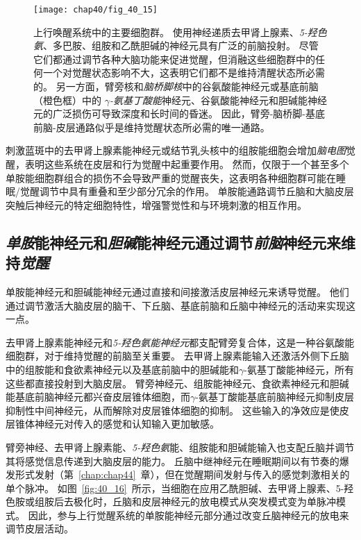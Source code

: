 \begin{figure}[htbp]
	\centering
	\texttt{[image: chap40/fig\_40\_15]}
	\caption{上行唤醒系统中的主要细胞群。
		使用神经递质去甲肾上腺素、\textit{5-羟色氨}、多巴胺、组胺和乙酰胆碱的神经元具有广泛的前脑投射。
		尽管它们都通过调节各种大脑功能来促进觉醒，但消融这些细胞群中的任何一个对觉醒状态影响不大，这表明它们都不是维持清醒状态所必需的。
		另一方面，臂旁核和\textit{脑桥脚核}中的谷氨酸能神经元或基底前脑（橙色框）中的 \textit{$\gamma$-氨基丁酸能}神经元、谷氨酸能神经元和胆碱能神经元的广泛损伤可导致深度和长时间的昏迷。
		因此，臂旁-脑桥脚-基底前脑-皮层通路似乎是维持觉醒状态所必需的唯一通路。}
	\label{fig:40_15}
\end{figure}


刺激蓝斑中的去甲肾上腺素能神经元或结节乳头核中的组胺能细胞会增加\textit{脑电图}觉醒，表明这些系统在皮层和行为觉醒中起重要作用。
然而，仅限于一个甚至多个单胺能细胞群组合的损伤不会导致严重的觉醒丧失，这表明各种细胞群可能在睡眠/觉醒调节中具有重叠和至少部分冗余的作用。
单胺能通路调节丘脑和大脑皮层突触后神经元的特定细胞特性，增强警觉性和与环境刺激的相互作用。



\subsection{\textit{单胺}能神经元和\textit{胆碱}能神经元通过调节\textit{前脑}神经元来维持\textit{觉醒}}

单胺能神经元和胆碱能神经元通过直接和间接激活皮层神经元来诱导觉醒。
他们通过调节激活大脑皮层的脑干、下丘脑、基底前脑和丘脑中神经元的活动来实现这一点。


去甲肾上腺素能神经元和\textit{5-羟色氨能神经元}都支配臂旁复合体，这是一种谷氨酸能细胞群，对于维持觉醒的前脑至关重要。
去甲肾上腺素能输入还激活外侧下丘脑中的组胺能和食欲素神经元以及基底前脑中的胆碱能和$\gamma$-氨基丁酸能神经元，所有这些都直接投射到大脑皮层。
臂旁神经元、组胺能神经元、食欲素神经元和胆碱能基底前脑神经元都兴奋皮层锥体细胞，而$\gamma$-氨基丁酸能基底前脑神经元抑制皮层抑制性中间神经元，从而解除对皮层锥体细胞的抑制。
这些输入的净效应是使皮层锥体神经元对传入的感觉和认知输入更加敏感。


臂旁神经、去甲肾上腺素能、\textit{5-羟色氨}能、组胺能和胆碱能输入也支配丘脑并调节其将感觉信息传递到大脑皮层的能力。
丘脑中继神经元在睡眠期间以有节奏的爆发形式发射（第~\ref{chap:chap44}~章），但在觉醒期间发射与传入的感觉刺激相关的单个脉冲。
如图~\ref{fig:40_16}~所示，当细胞在应用乙酰胆碱、去甲肾上腺素、5-羟色胺或组胺后去极化时，丘脑和皮层神经元的放电模式从突发模式变为单脉冲模式。
因此，参与上行觉醒系统的单胺能神经元部分通过改变丘脑神经元的放电来调节皮层活动。


